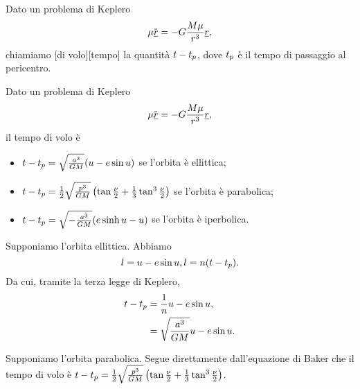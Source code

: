 \begin{Definition}
  Dato un problema di Keplero
	\[
		\mu \ddot{\underline{r}}
    = - G \frac{M\mu}{r^3}\underline{r},
	\]
  chiamiamo
  [di volo][tempo]
  la quantit\`a $t - {t_p}$, dove
  ${t_p}$ \`e il tempo di passaggio al pericentro.
\end{Definition}
\begin{Theorem}
  Dato un problema di Keplero
	\[
		\mu \ddot{\underline{r}}
    = - G \frac{M\mu}{r^3}\underline{r},
	\]
  il tempo di volo \`e
  \begin{itemize}
    \item $t - {t_p}
            = \sqrt{\frac{a^3}{GM}}
              (u - e \sin u)$
          se l'orbita \`e ellittica;
    \item $t - {t_p}
            = \frac{1}{2}
              \sqrt{\frac{p^3}{GM}}
              \left (
              \tan \frac{\nu}{2}
              + \frac{1}{3} \tan^3 \frac{\nu}{2}
              \right )$
          se l'orbita \`e parabolica;
    \item $t - {t_p}
            = \sqrt{-\frac{a^3}{GM}}
              (e \sinh u - u)$
          se l'orbita \`e iperbolica.
  \end{itemize}
\end{Theorem}
\Proof Supponiamo l'orbita ellittica. Abbiamo
\[
  l
    = u - e \sin u,\\
  l
    = n (t - {t_p}).
\]
Da cui, tramite la terza legge di Keplero,
\begin{align*}
  t - {t_p}
    &= \frac{1}{n} 
      u - e \sin u,\\
    &= \sqrt{\frac{a^3}{GM}}
      u - e \sin u.
\end{align*}
\par Supponiamo l'orbita parabolica. Segue direttamente dall'equazione
di Baker che il tempo di volo \`e
$t - {t_p}
= \frac{1}{2}
\sqrt{\frac{p^3}{GM}}
\left (
\tan \frac{\nu}{2}
+ \frac{1}{3} \tan^3 \frac{\nu}{2}
\right )$.
